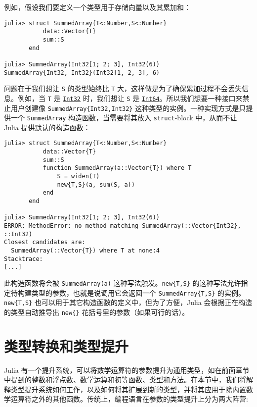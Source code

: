 例如，假设我们要定义一个类型用于存储向量以及其累加和：




\begin{verbatim}
julia> struct SummedArray{T<:Number,S<:Number}
           data::Vector{T}
           sum::S
       end

julia> SummedArray(Int32[1; 2; 3], Int32(6))
SummedArray{Int32, Int32}(Int32[1, 2, 3], 6)
\end{verbatim}



问题在于我们想让 \texttt{S} 的类型始终比 \texttt{T} 大，这样做是为了确保累加过程不会丢失信息。例如，当 \texttt{T} 是 \hyperlink{10103694114785108551}{\texttt{Int32}} 时，我们想让 \texttt{S} 是 \hyperlink{7720564657383125058}{\texttt{Int64}}。所以我们想要一种接口来禁止用户创建像 \texttt{SummedArray\{Int32,Int32\}} 这种类型的实例。一种实现方式是只提供一个 \texttt{SummedArray} 构造函数，当需要将其放入 \texttt{struct}-block 中，从而不让 Julia 提供默认的构造函数：




\begin{verbatim}
julia> struct SummedArray{T<:Number,S<:Number}
           data::Vector{T}
           sum::S
           function SummedArray(a::Vector{T}) where T
               S = widen(T)
               new{T,S}(a, sum(S, a))
           end
       end

julia> SummedArray(Int32[1; 2; 3], Int32(6))
ERROR: MethodError: no method matching SummedArray(::Vector{Int32}, ::Int32)
Closest candidates are:
  SummedArray(::Vector{T}) where T at none:4
Stacktrace:
[...]
\end{verbatim}



此构造函数将会被 \texttt{SummedArray(a)} 这种写法触发。\texttt{new\{T,S\}} 的这种写法允许指定待构建类型的参数，也就是说调用它会返回一个 \texttt{SummedArray\{T,S\}} 的实例。\texttt{new\{T,S\}} 也可以用于其它构造函数的定义中，但为了方便，Julia 会根据正在构造的类型自动推导出 \texttt{new\{\}} 花括号里的参数（如果可行的话）。



\hypertarget{10686378388163930476}{}


\chapter{类型转换和类型提升}



Julia 有一个提升系统，可以将数学运算符的参数提升为通用类型，如在前面章节中提到的\hyperlink{8249022581856827126}{整数和浮点数}、\hyperlink{16865688524696028421}{数学运算和初等函数}、\hyperlink{8510890508040013186}{类型}和\hyperlink{3842379394166369470}{方法}。在本节中，我们将解释类型提升系统如何工作，以及如何将其扩展到新的类型，并将其应用于除内置数学运算符之外的其他函数。传统上，编程语言在参数的类型提升上分为两大阵营:



